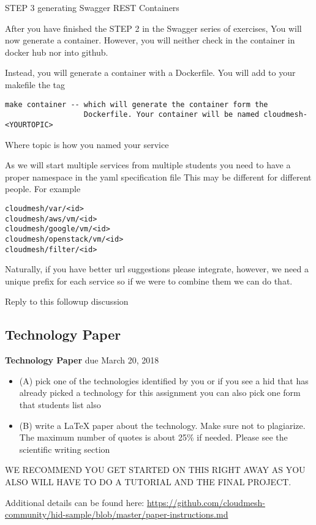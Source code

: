 \begin{exercise}

STEP 3 generating Swagger REST Containers

After you have finished the STEP 2 in the Swagger series of exercises,
You will now generate a container. However, you will neither check in
the container in docker hub nor into github.

 

Instead, you will generate a container with a Dockerfile. You will add
to your makefile the tag

 
\begin{lstlisting}
make container -- which will generate the container form the
                  Dockerfile. Your container will be named cloudmesh-<YOURTOPIC>
\end{lstlisting}

Where topic is how you named your service

As we will start multiple services from multiple students you need to
have a proper namespace in the yaml specification file This may be
different for different people. For example

 
\begin{lstlisting}
cloudmesh/var/<id>
cloudmesh/aws/vm/<id>
cloudmesh/google/vm/<id>
cloudmesh/openstack/vm/<id>
cloudmesh/filter/<id>
\end{lstlisting}

 

Naturally, if you have better url suggestions please integrate,
however, we need a unique prefix for each service so if we were to
combine them we can do that.

Reply to this followup discussion
\end{exercise}

\subsection{Technology Paper}
\label{E:616-tech-paper}

\begin{exercise} {\bf Technology Paper} due March 20, 2018

\begin{itemize}
Read the following two points to assist you in starting your paper 
\item (A) pick one of the technologies identified by you or if you see a
  hid that has already picked a technology for this assignment you can
  also pick one form that students list also

\item (B) write a LaTeX paper about the technology. Make sure not to
  plagiarize. The maximum number of quotes is about 25\% if
  needed. Please see the scientific writing section

\end{itemize}
 WE RECOMMEND YOU GET STARTED ON THIS RIGHT AWAY AS YOU ALSO WILL HAVE
 TO DO A TUTORIAL AND THE FINAL PROJECT.

Additional details can be found here:
\url{https://github.com/cloudmesh-community/hid-sample/blob/master/paper-instructions.md}

\end{exercise}

